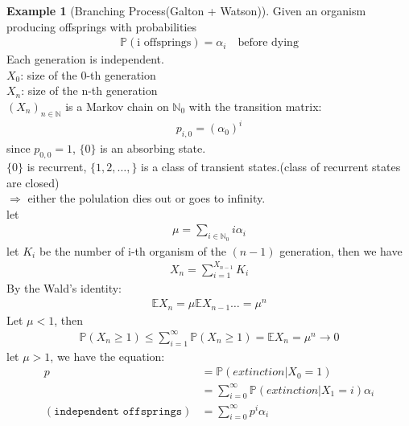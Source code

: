 \documentclass[a4paper,11pt]{book}
\theoremstyle{definition}
\newtheorem*{example}{Example}
\theoremstyle{remark}
\begin{document}
\begin{example}[Branching Process(Galton + Watson)]
	Given an organism producing offsprings with probabilities
	\begin{align*}
		\mathbb{P}(\text{i offsprings}) = \alpha_i \quad \text{before dying}
	\end{align*}
	Each generation is independent.\\
	$X_0$: size of the 0-th generation\\
	$X_n$: size of the n-th generation\\
	$(X_n)_{n \in \mathbb{N}}$ is a Markov chain on $\mathbb{N}_0$ with the transition matrix:
	\begin{align*}
		p_{i, 0} = (\alpha_0)^i
	\end{align*}
	since $p_{0, 0} = 1$, $\{0\}$ is an absorbing state.\\
	$\{0\}$ is recurrent, $\{1, 2, \dots, \}$ is a class of transient states.(class of recurrent states are closed)\\
	$\Rightarrow$ either the polulation dies out or goes to infinity.\\
	let 
	\begin{align*}
		\mu= \sum_{i \in \mathbb{N}_0} i \alpha_i
	\end{align*}
	let $K_i$ be the number of i-th organism of the $(n-1)$ generation, then we have
	\begin{align*}
		X_n = \sum_{i = 1}^{X_{n-1}} K_i 
	\end{align*}
	By the Wald's identity:
	\begin{align*}
		\mathbb{E} X_n = \mu \mathbb{E} X_{n-1} \dots = \mu^n 
	\end{align*}
	Let $\mu < 1$, then 
	\begin{align*}
		\mathbb{P}(X_n \ge 1) \le \sum_{i = 1}^\infty \mathbb{P}(X_n \geq 1) = \mathbb{E}X_n = \mu^n \rightarrow 0
	\end{align*}
	let $\mu >1$, we have the equation:
	\begin{align*}
		p &= \mathbb{P}(extinction|X_0 = 1)\\ 
		&= \sum_{i = 0}^\infty \mathbb{P}(extinction|X_1 = i)\alpha_i\\
		(\texttt{independent offsprings})
		&= \sum_{i= 0}^\infty p^i \alpha _i
	\end{align*}
\end{example}
\end{document}

